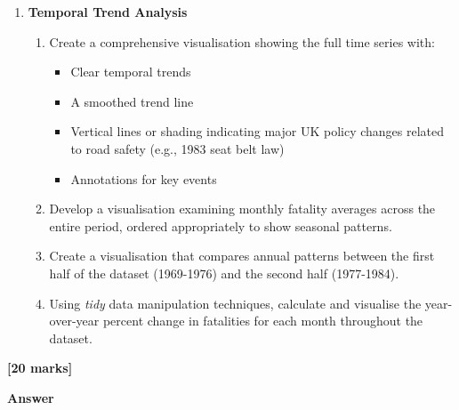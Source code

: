 \documentclass[
  10t,
]{article}
\providecommand{\tightlist}{%
  \setlength{\itemsep}{0pt}\setlength{\parskip}{0pt}}\usepackage{longtable,booktabs,array}
\begin{document}
\begin{enumerate}
\def\labelenumi{\alph{enumi}.}
\setcounter{enumi}{1}
\tightlist
\item
  \textbf{Temporal Trend Analysis}

  \begin{enumerate}
  \def\labelenumii{\roman{enumii}.}
  \tightlist
  \item
    Create a comprehensive visualisation showing the full time series
    with:

    \begin{itemize}
    \tightlist
    \item
      Clear temporal trends
    \item
      A smoothed trend line
    \item
      Vertical lines or shading indicating major UK policy changes
      related to road safety (e.g., 1983 seat belt law)
    \item
      Annotations for key events
    \end{itemize}
  \item
    Develop a visualisation examining monthly fatality averages across
    the entire period, ordered appropriately to show seasonal patterns.
  \item
    Create a visualisation that compares annual patterns between the
    first half of the dataset (1969-1976) and the second half
    (1977-1984).
  \item
    Using \emph{tidy} data manipulation techniques, calculate and
    visualise the year-over-year percent change in fatalities for each
    month throughout the dataset.
  \end{enumerate}
\end{enumerate}

\textbf{{[}20 marks{]}}

\textbf{Answer}
\end{document}
